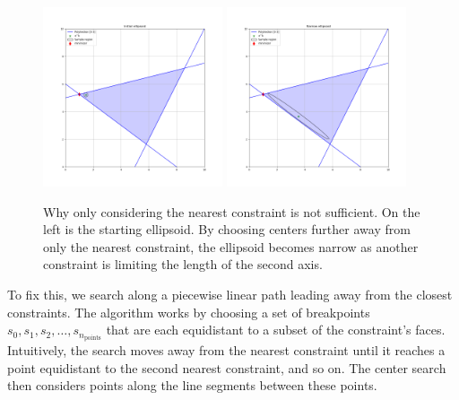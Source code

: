 \begin{figure}[ht]
    \centering
    \includegraphics[width=200px]{images/narrow_ellipsoid_1.png}
    \includegraphics[width=200px]{images/narrow_ellipsoid_2.png}
    \caption[Why only considering the nearest constraint is not sufficient. ]
        {Why only considering the nearest constraint is not sufficient.   On the left is the starting ellipsoid.
    	By choosing centers further away from only the nearest constraint, the ellipsoid becomes narrow as another constraint is limiting the length of the second axis.
	}
    \label{first_line_search}
\end{figure}

To fix this, we search along a piecewise linear path leading away from the closest constraints.   
The algorithm works by choosing a set of breakpoints $s_0, s_1, s_2, \ldots, s_{n_{\text{points}}}$
that are each equidistant to a subset of the constraint's faces.
Intuitively, the search moves away from the nearest constraint until it reaches a point equidistant to the second nearest constraint, and so on.
The center search then considers points along the line segments between these points.

